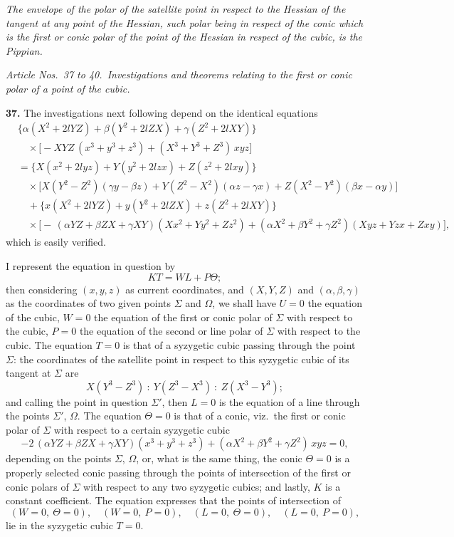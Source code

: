 \documentclass[11pt]{article}
\begin{document}
\medskip

\textit{The envelope of the polar of the satellite point in respect to the Hessian of the tangent at any point of the Hessian, such polar being in respect of the conic which is the first or conic polar of the point of the Hessian in respect of the cubic, is the Pippian.}

\bigskip

\textit{Article Nos.~37 to 40.\ Investigations and theorems relating to the first or conic polar of a point of the cubic.}

\medskip

\noindent \textbf{37.} The investigations next following depend on the identical equations
\begin{align*}
&\bigl\{\alpha (X^2 + 2 l Y Z) + \beta (Y^2 + 2 l Z X) + \gamma (Z^2 + 2 l X Y)\bigr\} \\
&\quad \times \bigl[-X Y Z\,(x^3 + y^3 + z^3) + (X^3 + Y^3 + Z^3)\, x y z\bigr] \\
&= \bigl\{X(x^2 + 2 l y z) + Y(y^2 + 2 l z x) + Z(z^2 + 2 l x y)\bigr\} \\
&\quad \times \bigl[X(Y^2 - Z^2)(\gamma y - \beta z) + Y(Z^2 - X^2)(\alpha z - \gamma x) + Z(X^2 - Y^2)(\beta x - \alpha y)\bigr] \\
&\quad + \bigl\{x(X^2 + 2 l Y Z) + y(Y^2 + 2 l Z X) + z(Z^2 + 2 l X Y)\bigr\} \\
&\quad \times \bigl[-\,(\alpha Y Z + \beta Z X + \gamma X Y)(X x^2 + Y y^2 + Z z^2) + (\alpha X^2 + \beta Y^2 + \gamma Z^2)(X y z + Y z x + Z x y)\bigr],
\end{align*}
which is easily verified.

I represent the equation in question by
\[
K T = W L + P\Theta;
\]
then considering $(x, y, z)$ as current coordinates, and $(X, Y, Z)$ and $(\alpha, \beta, \gamma)$ as the coordinates of two given points $\Sigma$ and $\Omega$, we shall have $U = 0$ the equation of the cubic, $W = 0$ the equation of the first or conic polar of $\Sigma$ with respect to the cubic, $P = 0$ the equation of the second or line polar of $\Sigma$ with respect to the cubic. The equation $T = 0$ is that of a syzygetic cubic passing through the point $\Sigma$: the coordinates of the satellite point in respect to this syzygetic cubic of its tangent at $\Sigma$ are
\[
X(Y^3 - Z^3)\ :\ Y(Z^3 - X^3)\ :\ Z(X^3 - Y^3);
\]
and calling the point in question $\Sigma'$, then $L = 0$ is the equation of a line through the points $\Sigma'$, $\Omega$. The equation $\Theta = 0$ is that of a conic, viz.\ the first or conic polar of $\Sigma$ with respect to a certain syzygetic cubic
\[
-2\,(\alpha Y Z + \beta Z X + \gamma X Y)(x^3 + y^3 + z^3) + (\alpha X^2 + \beta Y^2 + \gamma Z^2)\, x y z = 0,
\]
depending on the points $\Sigma$, $\Omega$, or, what is the same thing, the conic $\Theta = 0$ is a properly selected conic passing through the points of intersection of the first or conic polars of $\Sigma$ with respect to any two syzygetic cubics; and lastly, $K$ is a constant coefficient. The equation expresses that the points of intersection of
\[
(W = 0,\ \Theta = 0),\quad (W = 0,\ P = 0),\quad (L = 0,\ \Theta = 0),\quad (L = 0,\ P = 0),
\]
lie in the syzygetic cubic $T = 0$.
\end{document}
